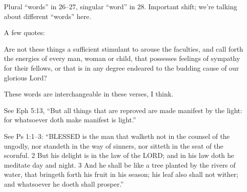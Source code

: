 		\begin{description}
		
		\item[26--28$\vert$]
		
		\item[27$\vert$]
		\end{compactdesc}
		
		\item[28--43$\vert$]
		\begin{compactdesc}
		\item[word/seed/tree] These words are interchangeable in these verses, I think.
		\end{compactdesc}

		\item[35$\vert$]
		\begin{compactdesc}
		\item[because it is light] See Eph 5:13, ``But all things that are reproved are made manifest by the light: for whatsoever doth make manifest is light.''
		\end{compactdesc}
		
		\item[42$\vert$]
		\begin{compactdesc}
		\item[tree] See Ps 1:1--3: ``BLESSED is the man that walketh not in the counsel of the ungodly, nor standeth in the way of sinners, nor sitteth in the seat of the scornful. 2 But his delight is in the law of the LORD; and in his law doth he meditate day and night. 3 And he shall be like a tree planted by the rivers of water, that bringeth forth his fruit in his season; his leaf also shall not wither; and whatsoever he doeth shall prosper.''
		\end{compactdesc}

		\end{description}
		
